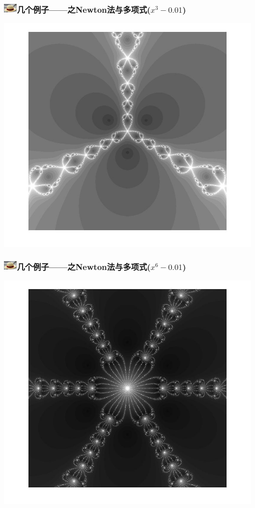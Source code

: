\documentclass{beamer}
\begin{document}
\begin{frame}
\frametitle{\includegraphics[width=7mm,height=5mm]{Images/strawhat.jpg}几个例子——之Newton法与多项式($x^3-0.01$)}
\vspace{-3mm}
\begin{center}
\includegraphics[width=0.9\linewidth]{Images/newton_poly_3.jpg}
\end{center}
\end{frame}
\begin{frame}
\frametitle{\includegraphics[width=7mm,height=5mm]{Images/strawhat.jpg}几个例子——之Newton法与多项式($x^6-0.01$)}
\vspace{-3mm}
\begin{center}
\includegraphics[width=0.85\linewidth]{Images/newton_poly_6.jpg}
\end{center}
\end{frame}
\end{document}
